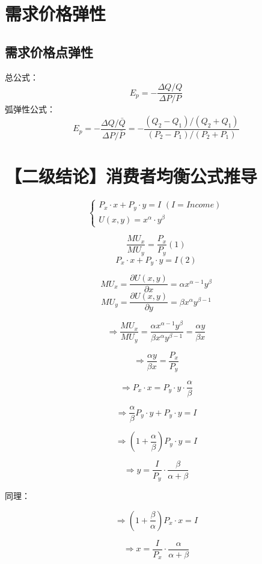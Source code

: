 \documentclass[cn,hazy,blue,14pt,screen]{elegantnote}
\title{}
\author{}
\begin{document}
\maketitle

\section{需求价格弹性}
\subsection{需求价格点弹性}
总公式：
$$E_p = - \frac{\Delta Q / Q}{\Delta P / P} $$
弧弹性公式：
$$E_p = - \frac{\Delta Q / \bar{Q}}{\Delta P / \bar{P}} = - \frac{(Q_2 -Q_1)/(Q_2+Q_1)}{(P_2 -P_1)/(P_2+P_1)} $$
\section{【二级结论】消费者均衡公式推导}

$$\begin{cases}
    P_x \cdot x + P_y \cdot y = I \,\, (I=Income)\\
    U(x,y) = x^{\alpha} \cdot y^{\beta}
\end{cases} $$

$$ \frac{MU_x}{MU_y} = \frac{P_x}{P_y} (1)$$
$$P_x \cdot x + P_y \cdot y = I (2)$$

$$ MU_x = \frac{\partial U(x,y)}{\partial x} = \alpha x^{\alpha - 1}y^{\beta} $$
$$ MU_y = \frac{\partial U(x,y)}{\partial y} = \beta x^{\alpha}y^{\beta - 1} $$

$$\Rightarrow \frac{MU_x}{MU_y} =  \frac{\alpha x^{\alpha-1} y^{\beta}}{\beta x^{\alpha}y^{\beta - 1}} = \frac{\alpha y}{\beta x} $$

$$\Rightarrow \frac{\alpha y}{\beta x} = \frac{P_x}{P_y} $$

$$\Rightarrow P_x \cdot x = P_y \cdot y \cdot \frac{\alpha}{\beta} $$

$$\Rightarrow \frac{\alpha}{\beta}P_y\cdot y + P_y \cdot y = I $$

$$\Rightarrow (1+\frac{\alpha}{\beta})P_y\cdot y  = I $$

$$\Rightarrow y= \frac{I}{P_y} \cdot \frac{\beta}{\alpha+\beta}$$

同理：

$$\Rightarrow (1+\frac{\beta}{\alpha})P_x\cdot x  = I $$

$$\Rightarrow x= \frac{I}{P_x} \cdot \frac{\alpha}{\alpha+\beta}$$
\end{document}
